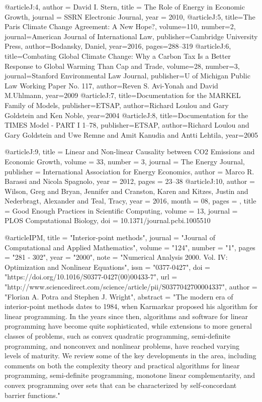 @article{J:4,
author = {David I. Stern},
title = {The Role of Energy in Economic Growth},
journal = {SSRN Electronic Journal},
year = {2010},
}
@article{J:5, 
title={The Paris Climate Change Agreement: A New Hope?}, 
volume={110}, 
number={2}, 
journal={American Journal of International Law}, 
publisher={Cambridge University Press}, 
author={Bodansky, Daniel}, 
year={2016}, 
pages={288–319}
}
@article{J:6, 
title={Combating Global Climate Change: Why a Carbon Tax Is a Better Response to Global Warming Than Cap and Trade}, 
volume={28}, 
number={3}, 
journal={Stanford Environmental Law Journal}, 
publisher={U of Michigan Public Law Working Paper No. 117}, 
author={Reven S. Avi-Yonah and David M.Uhlmann}, 
year={2009}
}
@article{J:7, 
title={Documentation for the MARKEL Family of Models},  
publisher={ETSAP}, 
author={Richard Loulou and Gary Goldstein and Ken Noble}, 
year={2004}
}
@article{J:8, 
title={Documentation for the TIMES Model - PART I 1–78},  
publisher={ETSAP}, 
author={Richard Loulou and Gary Goldstein and Uwe Remne and Amit Kanudia and Antti Lehtila}, 
year={2005}
}

@article{J:9,
title = {Linear and Non-linear Causality between CO2 Emissions and Economic Growth},
volume = {33},
number = {3},
journal = {The Energy Journal},
publisher = {International Association for Energy Economics},
author = {Marco R. Barassi and Nicola Spagnolo},
year = {2012},
pages = {23--38}
}
@article{J:10,
author = {Wilson, Greg and Bryan, Jennifer and Cranston, Karen and Kitzes, Justin and Nederbragt, Alexander and Teal, Tracy},
year = {2016},
month = {08},
pages = {},
title = {Good Enough Practices in Scientific Computing},
volume = {13},
journal = {PLOS Computational Biology},
doi = {10.1371/journal.pcbi.1005510}
}

@article{IPM,
title = "Interior-point methods",
journal = "Journal of Computational and Applied Mathematics",
volume = "124",
number = "1",
pages = "281 - 302",
year = "2000",
note = "Numerical Analysis 2000. Vol. IV: Optimization and Nonlinear Equations",
issn = "0377-0427",
doi = "https://doi.org/10.1016/S0377-0427(00)00433-7",
url = "http://www.sciencedirect.com/science/article/pii/S0377042700004337",
author = "Florian A. Potra and Stephen J. Wright",
abstract = "The modern era of interior-point methods dates to 1984, when Karmarkar proposed his algorithm for linear programming. In the years since then, algorithms and software for linear programming have become quite sophisticated, while extensions to more general classes of problems, such as convex quadratic programming, semi-definite programming, and nonconvex and nonlinear problems, have reached varying levels of maturity. We review some of the key developments in the area, including comments on both the complexity theory and practical algorithms for linear programming, semi-definite programming, monotone linear complementarity, and convex programming over sets that can be characterized by self-concordant barrier functions."
}



